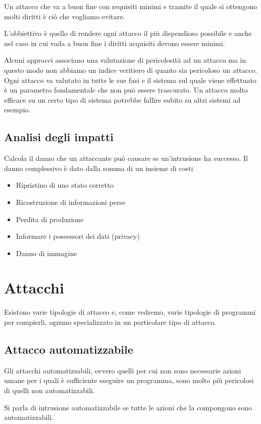 Un attacco che va a buon fine con requisiti minimi e tramite il quale si ottengono molti diritti è ciò che vogliamo
evitare.

L'obbiettivo è quello di rendere ogni attacco il più dispendioso possibile e anche nel caso in cui vada a buon fine i
diritti acquisiti devono essere minimi.

Alcuni approcci associano una valutazione di pericolosità ad un attacco ma in questo modo non abbiamo un indice
veritiero di quanto sia pericoloso un attacco. Ogni attacco va valutato in tutte le sue fasi e il sistema sul quale
viene effettuato è un parametro fondamentale che non può essere trascurato. Un attacco molto efficace su un certo tipo
di sistema potrebbe fallire subito su altri sistemi ad esempio.

\subsection{Analisi degli impatti}
Calcola il danno che un attaccante può causare se un'intrusione ha successo. Il danno complessivo è dato dalla somma
di un insieme di costi
\begin{itemize}
	\item Ripristino di uno stato corretto
	\item Ricostruzione di informazioni perse
	\item Perdita di produzione
	\item Informare i possessori dei dati (privacy)
	\item Danno di immagine
\end{itemize}

\section{Attacchi}
Esistono varie tipologie di attacco e, come vedremo, varie tipologie di programmi per compierli, ognuno specializzato
in un particolare tipo di attacco.

\subsection{Attacco automatizzabile}
Gli attacchi automatizzabili, ovvero quelli per cui non sono necessarie azioni umane per i quali è sufficiente eseguire
un programma, sono molto più pericolosi di quelli non automatizzabili.

Si parla di intrusione automatizzabile se tutte le azioni che la compongono sono automatizzabili.


